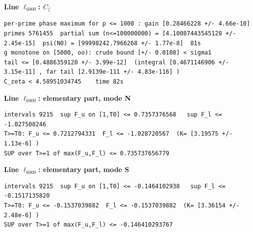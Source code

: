 \documentclass[11pt,reqno]{amsart}
\numberwithin{equation}{section}
\theoremstyle{definition}
\theoremstyle{remark}
\newcommand{\appsub}[1]{\par\medskip\noindent\textbf{#1}\par\nobreak\smallskip}
\begin{document}
\appsub{Line $\ell_{6000}$: $C_\zeta$}
\begin{lstlisting}
per-prime phase maximum for p <= 1000 : gain [0.28466228 +/- 4.66e-10]
primes 5761455  partial sum (n<=100000000) = [4.10087443545128 +/- 2.45e-15]  psi(N0) = [99998242.7966268 +/- 1.77e-8]  81s
g monotone on [5000, oo): crude bound [+/- 0.0108] < sigma1
tail <= [0.4886359120 +/- 3.99e-12]  (integral [0.4671146906 +/- 3.15e-11] , far tail [2.9139e-111 +/- 4.83e-116] )
C_zeta < 4.58951034745    time 82s
\end{lstlisting}
\appsub{Line $\ell_{6000}$: elementary part, mode N}
\begin{lstlisting}
intervals 9215  sup F_u on [1,T0] <= 0.7357376568   sup F_l <= -1.027508246
T>=T0: F_u <= 0.7212794331  F_l <= -1.028720567  (K= [3.19575 +/- 1.13e-6] )
SUP over T>=1 of max(F_u,F_l) <= 0.735737656779
\end{lstlisting}
\appsub{Line $\ell_{6000}$: elementary part, mode S}
\begin{lstlisting}
intervals 9215  sup F_u on [1,T0] <= -0.1464102938   sup F_l <= -0.1517135820
T>=T0: F_u <= -0.1537039882  F_l <= -0.1537039882  (K= [3.36154 +/- 2.48e-6] )
SUP over T>=1 of max(F_u,F_l) <= -0.146410293767
\end{lstlisting}
\end{document}
